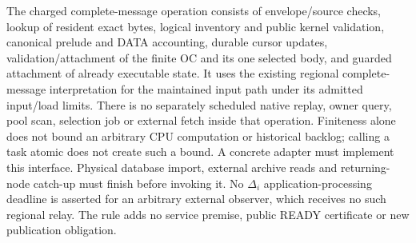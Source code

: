 The charged complete-message operation consists of envelope/source
checks, lookup of resident exact bytes, logical inventory and public
kernel validation, canonical prelude and DATA accounting, durable cursor
updates, validation/attachment of the finite OC and its one selected
body, and guarded attachment of already executable state. It uses
the existing regional complete-message interpretation for the maintained
input path under its admitted input/load limits. There is no separately
scheduled native replay, owner query, pool scan, selection job or
external fetch inside that operation.
Finiteness alone does not bound an arbitrary CPU computation or historical
backlog; calling a task atomic does not create such a bound. A concrete
adapter must implement this interface. Physical database import, external
archive reads and returning-node catch-up must finish before invoking
it. No $\Delta_i$ application-processing deadline is asserted for an
arbitrary external observer, which receives no such regional relay.
The rule adds no service premise, public READY certificate or new
publication obligation.
